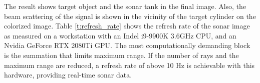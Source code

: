 \documentclass[utf8]{frontiersSCNS} %
\begin{document}
The result shows target object and the sonar tank in the final image. Also, the beam scattering of the signal is shown in the vicinity of the target cylinder on the colorized image. Table \ref{t:refresh_rate} shows the refresh rate of the sonar image as measured on a workstation with an Indel i9-9900K 3.6GHz CPU, and an Nvidia GeForce RTX 2080Ti GPU. The most computationally demanding block is the summation that limits maximum range. If the number of rays and the maximum range are reduced, a refresh rate of above 10 Hz is achievable with this hardware, providing real-time sonar data.

\begin{table}[ht]
\centering
\caption{The refresh rate and calculation time of the sonar image for various sonar configurations}
\label{t:refresh_rate}
\end{table}
\end{document}
